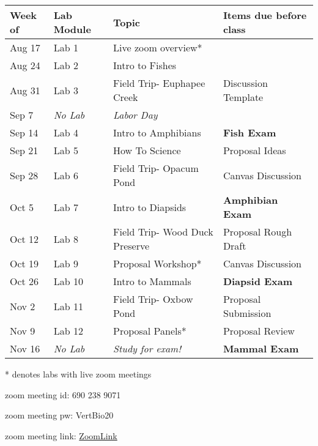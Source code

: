 \documentclass[11pt, a4paper]{article}
\begin{document}
\begin{table}[H]
\begin{singlespace}
\centering
\label{Table:Schedule}
\begin{tabular}{llll}\hline
Week of & Lab Module          & Topic                           & Items due before class  \\ \hline
Aug 17  & Lab 1               & Live zoom overview*             &                         \\
Aug 24  & Lab 2               & Intro to Fishes                 &                         \\
Aug 31  & Lab 3               & Field Trip- Euphapee Creek      & Discussion Template     \\
Sep 7   & \textit{No Lab}     & \textit{Labor Day}              &                         \\
Sep 14  & Lab 4               & Intro to Amphibians             & \textbf{Fish Exam}      \\
Sep 21  & Lab 5               & How To Science                  & Proposal Ideas          \\
Sep 28  & Lab 6               & Field Trip- Opacum Pond         & Canvas Discussion       \\
Oct 5   & Lab 7               & Intro to Diapsids               & \textbf{Amphibian Exam} \\
Oct 12  & Lab 8               & Field Trip- Wood Duck Preserve  & Proposal Rough Draft    \\
Oct 19  & Lab 9               & Proposal Workshop*              & Canvas Discussion       \\
Oct 26  & Lab 10              & Intro to Mammals                & \textbf{Diapsid Exam}   \\
Nov 2   & Lab 11              & Field Trip- Oxbow Pond          & Proposal Submission     \\
Nov 9   & Lab 12              & Proposal Panels*                & Proposal Review         \\
Nov 16  & \textit{No Lab}     & \textit{Study for exam!}        & \textbf{Mammal Exam}    \\ \hline
\end{tabular}
\begin{tablenotes}
\item{* denotes labs with live zoom meetings}
\item{zoom meeting id: 690 238 9071}
\item{zoom meeting pw: VertBio20}
\item{zoom meeting link: \href{https://us02web.zoom.us/j/6902389071?pwd=MXA3eGVCbkw5djBZUDQ2NWU2bGtLdz09}{ZoomLink}}
\end{tablenotes}
\end{singlespace}
\end{table}
\end{document}
